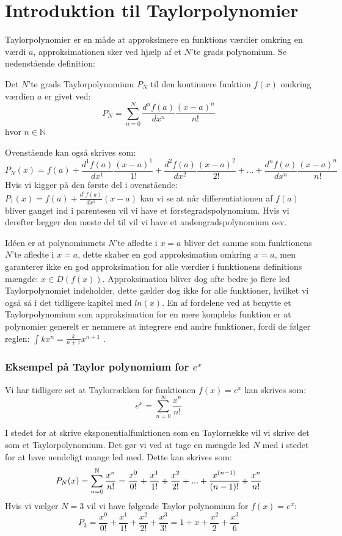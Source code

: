 \chapter{Introduktion til Taylorpolynomier}
\label{ch:tp}
Taylorpolynomier er en måde at approksimere en funktions værdier omkring en værdi $a$, 
approksimationen sker ved hjælp af et $N$'te grads polynomium. Se nedenstående definition: 
\begin{defn}
    Det $N$'te grads Taylorpolynomium $P_N$ til den kontinuere funktion $f(x)$ omkring værdien $a$ er givet ved:
    \[
    P_N = \sum^{N}_{n=0} \frac{d^n f(a)}{dx^n}\frac{(x-a)^{n}}{n!}
    \]
    hvor $n \in \mathbb{N}$
\end{defn}
\label{def:taylorPolynomium}
Ovenstående kan også skrives som:
    \[
    P_N(x)=f(a)+\frac{d^1 f(a)}{dx^1} \frac{(x-a)^{1}}{1!}+\frac{d^2 f(a)}{dx^2} \frac{(x-a)^{2}}{2!}+...+\frac{d^n f(a)}{dx^n} \frac{(x-a)^{n}}{n!}
    \]
Hvis vi kigger på den første del i ovenstående: $P_1(x)=f(a)+\frac{d^1 f(a)}{dx^1}(x-a)$ kan vi se at når differentiationen af $f(a)$ bliver ganget ind i parentesen vil vi have et førstegradspolynomium. 
Hvis vi derefter lægger den næste del til vil vi have et andengradspolynomium osv. 

Idéen er at polynomiumets $N$'te afledte i $x = a$ bliver det samme som funktionens $N$'te afledte i $x = a$, 
dette skaber en god approksimation omkring $x = a$, men garanterer ikke en god approksimation 
for alle værdier i funktionens definitions mængde: $x \in D(f(x))$. Approksimation bliver dog ofte bedre jo 
flere led Taylorpolynomiet indeholder, dette gælder dog ikke for alle funktioner, hvilket vi også så i det tidligere kapitel med $ln(x)$.
En af fordelene ved at benytte et Taylorpolynomium som approksimation for en mere kompleks funktion
er at polynomier generelt er nemmere at integrere end andre funktioner, fordi de følger reglen: $\int k x^n = \frac{k}{n + 1}x^{n + 1}$ .


\subsection*{Eksempel på Taylor polynomium for $e^x$}
Vi har tidligere set at Taylorrækken for funktionen $f(x)=e^x$ kan skrives som:
\[
e^x=\sum^{\infty}_{n=0}\frac{x^n}{n!}
\]

I stedet for at skrive eksponentialfunktionen som en Taylorrække vil vi skrive det som et Taylorpolynomium. Det gør vi ved at tage en mængde led $N$ med  i stedet for at have uendeligt mange led med. Dette kan skrives som:
\[
P_N(x)=\sum^{\mathbb{N}}_{n=0}\frac{x^n}{n!}=\frac{x^0}{0!}+\frac{x^1}{1!}+\frac{x^2}{2!}+...+\frac{x^{(n-1)}}{(n-1)!}+\frac{x^n}{n!}
\]
Hvis vi vælger $N=3$ vil vi have følgende Taylor polynomium for $f(x)=e^x$:
\[
P_3=\frac{x^0}{0!}+\frac{x^1}{1!}+\frac{x^2}{2!}+\frac{x^3}{3!}=1+x+\frac{x^2}{2}+\frac{x^3}{6}
\]

